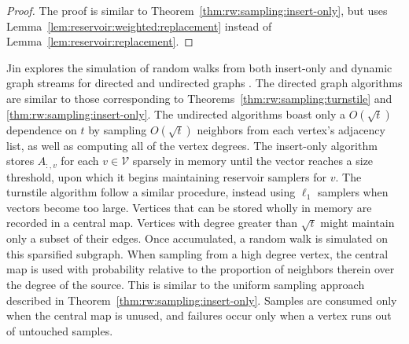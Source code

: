 \documentclass{report}
\begin{document}
\begin{proof}
The proof is similar to Theorem~\ref{thm:rw:sampling:insert-only}, but uses Lemma~\ref{lem:reservoir:weighted:replacement} instead of Lemma~\ref{lem:reservoir:replacement}.
\end{proof}


Jin explores the simulation of random walks from both insert-only and dynamic graph streams for directed and undirected graphs \cite{jin2018simulating}.
The directed graph algorithms are similar to those corresponding to Theorems~\ref{thm:rw:sampling:turnstile} and \ref{thm:rw:sampling:insert-only}.
The undirected algorithms boast only a $O(\sqrt{t})$ dependence on $t$ by sampling $O(\sqrt{t})$ neighbors from each vertex's adjacency list, as well as computing all of the vertex degrees.
The insert-only algorithm stores $A_{:,v}$ for each $v \in \mathcal{V}$ sparsely in memory until the vector reaches a size threshold, upon which it begins maintaining reservoir samplers for $v$.
The turnstile algorithm follow a similar procedure, instead using $\ell_1$ samplers when vectors become too large.
Vertices that can be stored wholly in memory are recorded in a central map.
Vertices with degree greater than $\sqrt{t}$ might maintain only a subset of their edges. 
Once accumulated, a random walk is simulated on this sparsified subgraph.
When sampling from a high degree vertex, the central map is used with probability relative to the proportion of neighbors therein over the degree of the source.
This is similar to the uniform sampling approach described in Theorem~\ref{thm:rw:sampling:insert-only}.
Samples are consumed only when the central map is unused, and failures occur only when a vertex runs out of untouched samples.

\end{document}
